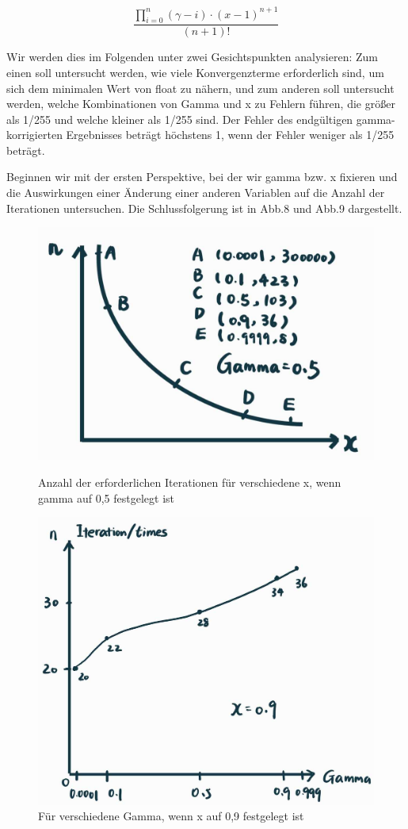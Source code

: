\documentclass[course=erap]{aspdoc}
\begin{document}
\[
\frac{{\prod_{i=0}^{n} (\gamma - i) \cdot (x-1)^{n+1}}}{{(n+1)!}} \label{eq:gamma_product}
\]

\par
Wir werden dies im Folgenden unter zwei Gesichtspunkten analysieren: Zum einen soll untersucht werden, wie viele Konvergenzterme erforderlich sind, um sich dem minimalen Wert von float zu nähern, und zum anderen soll untersucht werden, welche Kombinationen von Gamma und x zu Fehlern führen, die größer als 1/255 und welche kleiner als 1/255 sind. Der Fehler des endgültigen gamma-korrigierten Ergebnisses beträgt höchstens 1, wenn der Fehler weniger als 1/255 beträgt.

\par
Beginnen wir mit der ersten Perspektive, bei der wir gamma bzw. x fixieren und die Auswirkungen einer Änderung einer anderen Variablen auf die Anzahl der Iterationen untersuchen. Die Schlussfolgerung ist in Abb.8 und Abb.9 dargestellt.


\begin{figure}[h]
\centering
\begin{minipage}{0.48\textwidth}
\centering
\includegraphics[width=0.8\linewidth]{Bilder/xchange.jpg}
\caption{Anzahl der erforderlichen Iterationen für verschiedene x, wenn gamma auf 0,5 festgelegt ist}
\label{fig:xchange}
\end{minipage}\hfill
\begin{minipage}{0.48\textwidth}
\centering
\includegraphics[width=0.8\linewidth]{Bilder/Gammachange.jpg}
\caption{Für verschiedene Gamma, wenn x auf 0,9 festgelegt ist}
\label{fig:gammachange}
\end{minipage}
\end{figure}
\end{document}
